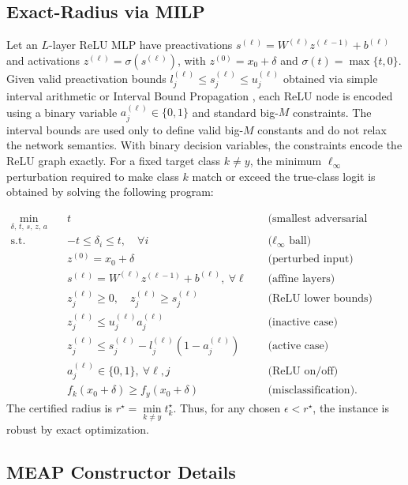 \documentclass{article}
\theoremstyle{definition}
\begin{document}
\subsection{Exact-Radius via MILP}
\label{app:milp}
Let an $L$-layer ReLU MLP have preactivations $s^{(\ell)}=W^{(\ell)}z^{(\ell-1)}+b^{(\ell)}$ and activations $z^{(\ell)}=\sigma(s^{(\ell)})$, with $z^{(0)}=x_0+\delta$ and $\sigma(t)=\max\{t,0\}$. Given valid preactivation bounds $l_j^{(\ell)}\leq s_j^{(\ell)}\leq u_j^{(\ell)}$ obtained via simple interval arithmetic or Interval Bound Propagation \cite{DBLP:journals/corr/abs-1810-12715}, each ReLU node is encoded using a binary variable $a_j^{(\ell)}\in\{0,1\}$ and standard big-$M$ constraints. The interval bounds are used only to define valid big-$M$ constants and do not relax the network semantics. With binary decision variables, the constraints encode the ReLU graph exactly. For a fixed target class $k\neq y$, the minimum $\ell_\infty$ perturbation required to make class $k$ match or exceed the true-class logit is obtained by solving the following program:

\begin{align*}
\min_{\delta,\, t,\, s,\, z,\, a} \quad & t 
&& \text{ (smallest adversarial radius)}\\
\text{s.t.} \quad 
& -t \le \delta_i \le t, \quad \forall i 
&& \text{ ($\ell_\infty$ ball)} \\[3pt]
& z^{(0)} = x_0 + \delta 
&& \text{ (perturbed input)} \\[3pt]
& s^{(\ell)} = W^{(\ell)} z^{(\ell-1)} + b^{(\ell)}, \ \forall \ell 
&& \text{ (affine layers)} \\[3pt]
& z^{(\ell)}_j \ge 0, \quad 
  z^{(\ell)}_j \ge s^{(\ell)}_j 
&& \text{ (ReLU lower bounds)} \\[3pt]
& z^{(\ell)}_j \le u^{(\ell)}_j a^{(\ell)}_j 
&& \text{ (inactive case)} \\[3pt]
& z^{(\ell)}_j \le s^{(\ell)}_j - l^{(\ell)}_j(1-a^{(\ell)}_j)
&& \text{ (active case)} \\[3pt]
& a^{(\ell)}_j \in \{0,1\}, \ \forall \ell,j 
&& \text{ (ReLU on/off)} \\[3pt]
& f_k(x_0+\delta) \ge f_y(x_0+\delta) 
&& \text{ (misclassification)}.
\end{align*}
The certified radius is $r^\star=\min\limits_{k\neq y}t_k^\star$. Thus, for any chosen $\epsilon<r^\star$, the instance is robust by exact optimization.


\subsection{MEAP Constructor Details}
\label{app:meap}
\end{document}
